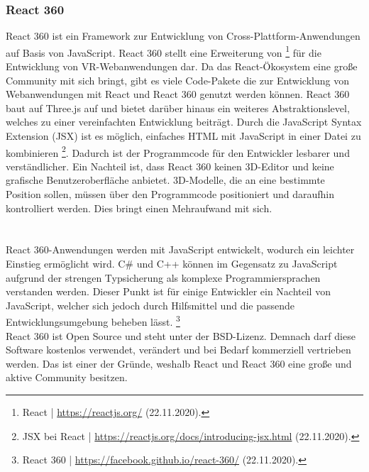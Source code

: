 \documentclass[a4paper,12pt,oneside]{article}
\begin{document}
      \subsubsection{React 360}
        React 360 ist ein Framework zur Entwicklung von Cross-Plattform-Anwendungen auf
        Basis von JavaScript. React 360 stellt eine Erweiterung von \footnote{React | \url{https://reactjs.org/} (22.11.2020).}
        für die Entwicklung von VR-Webanwendungen dar.
        Da das React-Ökosystem eine große Community mit sich bringt, gibt es viele
        Code-Pakete die zur Entwicklung von Webanwendungen mit React und React 360
        genutzt werden können.
        React 360 baut auf Three.js auf und bietet darüber hinaus ein weiteres 
        Abstraktionslevel, welches zu einer vereinfachten Entwicklung beiträgt. 
        Durch die JavaScript Syntax Extension (JSX)
        ist es möglich, einfaches HTML mit JavaScript in einer Datei zu kombinieren \footnote{JSX bei React | \url{https://reactjs.org/docs/introducing-jsx.html} (22.11.2020).}.
        Dadurch ist der Programmcode für den Entwickler lesbarer und verständlicher.
        Ein Nachteil ist, dass React 360 keinen 3D-Editor und
        keine grafische Benutzeroberfläche anbietet. 3D-Modelle, die
        an eine bestimmte Position sollen, müssen über den Programmcode positioniert und
        daraufhin kontrolliert werden. Dies bringt einen Mehraufwand mit sich. \\ \\ \\
        React 360-Anwendungen werden mit JavaScript entwickelt, wodurch ein leichter Einstieg
        ermöglicht wird. C\# und C++ können im Gegensatz zu JavaScript aufgrund der
        strengen Typsicherung als komplexe Programmiersprachen verstanden werden.
        Dieser Punkt ist für einige Entwickler ein Nachteil von JavaScript, welcher sich
        jedoch durch Hilfsmittel und die passende 
        Entwicklungsumgebung beheben lässt. \footnote{React 360 | \url{https://facebook.github.io/react-360/} (22.11.2020).} \\
        React 360 ist Open Source und steht unter der BSD-Lizenz. Demnach darf diese
        Software kostenlos verwendet, verändert und bei 
        Bedarf kommerziell vertrieben werden. Das ist einer der Gründe, weshalb
        React und React 360 eine große und aktive Community besitzen.
\end{document}
